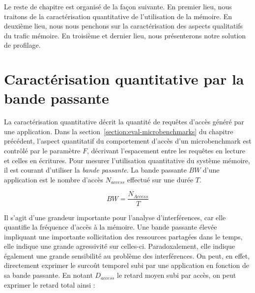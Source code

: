 Le reste de chapitre est organisé de la façon suivante.
En premier lieu, nous traitons de la caractérisation quantitative de l'utilisation de la mémoire.
En deuxième lieu, nous nous penchons sur la caractérisation des aspects qualitatifs du trafic mémoire.
En troisième et dernier lieu, nous présenterons notre solution de profilage.



\section{\label{subsection:quantitative} Caractérisation quantitative par la bande passante}

La caractérisation quantitative décrit la quantité de requêtes d'accès généré par une application.
Dans la section~\ref{section:eval-microbenchmarks} du chapitre précédent, l'aspect quantitatif du comportement d'accès d'un microbenchmark est contrôlé par le paramètre $F$, décrivant l'espacement entre les requêtes en lecture et celles en écritures.
Pour mesurer l'utilisation quantitative du système mémoire, il est courant d'utiliser la \emph{bande passante}. 
La bande passante $BW$ d'une application est le nombre d'accès $N_{access}$ effectué sur une durée $T$.

$$ BW = \frac{N_{Access}}{T} $$

Il s'agit d'une grandeur importante pour l'analyse d'interférences, car elle quantifie la fréquence d'accès à la mémoire.
Une bande passante élevée impliquant une importante sollicitation des ressources partagées dans le temps, elle indique une grande agressivité sur celles-ci.
Paradoxalement, elle indique également une grande sensibilité au problème des interférences.
On peut, en effet, directement exprimer le surcoût temporel subi par une application en fonction de sa bande passante.
En notant $D_{access}$ le retard moyen subi par accès, on peut exprimer le retard total ainsi : 


